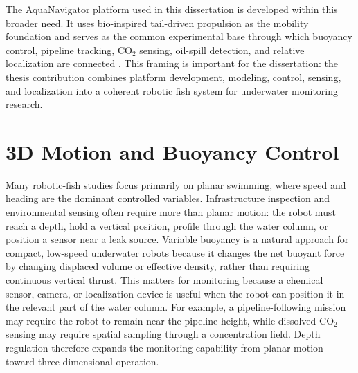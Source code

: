 \documentclass{uhcoethesis}
\begin{document}
The AquaNavigator platform used in this dissertation is developed within this broader need. It uses bio-inspired tail-driven propulsion as the mobility foundation and serves as the common experimental base through which buoyancy control, pipeline tracking, \mbox{CO$_2$} sensing, oil-spill detection, and relative localization are connected \cite{Masood2025Pipeline,Masood2025CO2,Masood2026OilSpill}. This framing is important for the dissertation: the thesis contribution combines platform development, modeling, control, sensing, and localization into a coherent robotic fish system for underwater monitoring research.

\section{3D Motion and Buoyancy Control}

Many robotic-fish studies focus primarily on planar swimming, where speed and heading are the dominant controlled variables. Infrastructure inspection and environmental sensing often require more than planar motion: the robot must reach a depth, hold a vertical position, profile through the water column, or position a sensor near a leak source. Variable buoyancy is a natural approach for compact, low-speed underwater robots because it changes the net buoyant force by changing displaced volume or effective density, rather than requiring continuous vertical thrust. This matters for monitoring because a chemical sensor, camera, or localization device is useful when the robot can position it in the relevant part of the water column. For example, a pipeline-following mission may require the robot to remain near the pipeline height, while dissolved \mbox{CO$_2$} sensing may require spatial sampling through a concentration field. Depth regulation therefore expands the monitoring capability from planar motion toward three-dimensional operation.
\end{document}
